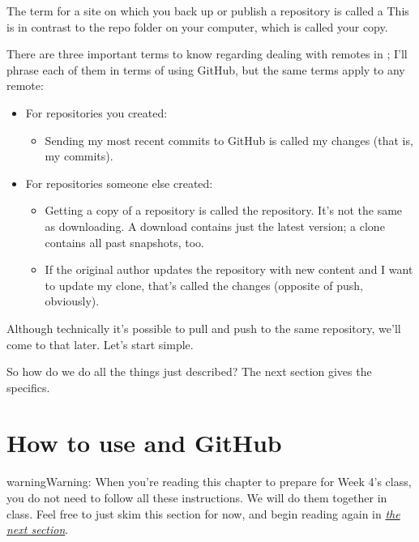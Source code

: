 \documentclass[letterpaper,10pt,english]{sphinxmanual}
\begin{document}
The  term for a site on which you back up or publish a repository is called a   This is in contrast to the repo folder on your computer, which is called your  copy.

There are three important terms to know regarding dealing with remotes in ; I’ll phrase each of them in terms of using GitHub, but the same terms apply to any remote:
\begin{itemize}
\item {} 
For repositories you created:
\begin{itemize}
\item {} 
Sending my most recent commits to GitHub is called  my changes (that is, my commits).

\end{itemize}

\item {} 
For repositories someone else created:
\begin{itemize}
\item {} 
Getting a copy of a repository is called  the repository.  It’s not the same as downloading.  A download contains just the latest version; a clone contains all past snapshots, too.

\item {} 
If the original author updates the repository with new content and I want to update my clone, that’s called  the changes (opposite of push, obviously).

\end{itemize}

\end{itemize}

Although technically it’s possible to pull and push to the same repository, we’ll come to that later.  Let’s start simple.

So how do we do all the things just described?  The next section gives the specifics.


\section{How to use  and GitHub}
\label{\detokenize{chapter-8-version-control:how-to-use-git-and-github}}
\begin{sphinxadmonition}{warning}{Warning:}
When you’re reading this chapter to prepare for Week 4’s class, you do not need to follow all these instructions.  We will do them together in class.  Feel free to just skim this section for now, and begin reading again in {\hyperref[\detokenize{chapter-8-version-control:what-if-i-want-to-collaborate}]{\emph{the next section}}}.
\end{sphinxadmonition}
\end{document}
